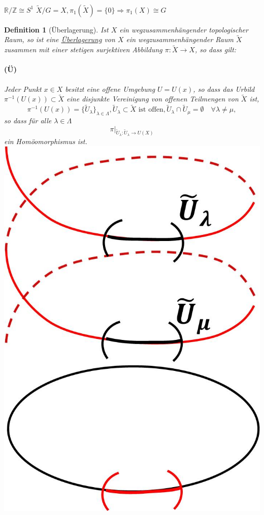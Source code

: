 \documentclass[a4paper,11pt,notitlepage]{report}
\newtheorem{definition}{Definition}[chapter]
\newcommand{\R}{{\ensuremath{\mathbb{R}}}}
\newcommand{\Z}{{\ensuremath{\mathbb{Z}}}}
\begin{document}
\paragraph{}
$\R / \Z \cong S^1$ \newline
$\tilde{X} /G = X, \pi_1(\tilde{X}) = \{0\} \Rightarrow \pi_1(X) \cong G$

\newpage 

\begin{definition}[Überlagerung]
	Ist $X$ ein wegzusammenhängender topologischer Raum, so ist eine \underline{Überlagerung} von $X$ ein wegzusammenhängender Raum $\tilde{X}$ zusammen mit einer stetigen surjektiven Abbildung $\pi \colon \tilde{X} \rightarrow X$, so dass gilt:
	\paragraph{(Ü)} \label{Ü} Jeder Punkt $x \in X$ besitzt eine offene Umgebung $U=U(x)$, so dass das Urbild $\pi^{-1}(U(x)) \subset \tilde{X}$ eine disjunkte Vereinigung von offenen Teilmengen von $\tilde{X}$ ist, 
	$$\pi^{-1}(U(x)) = \{\tilde{U}_\lambda\}_{\lambda \in \Lambda}, \tilde{U}_\lambda \subset \tilde{X}\text{ ist offen}, \tilde{U}_\lambda \cap \tilde{U}_\mu = \emptyset \quad \forall \lambda \neq \mu,$$ 
	so dass für alle $\lambda \in \Lambda$ 
	$$\pi \big |_{\tilde{U}_\lambda \colon \tilde{U}_\lambda \rightarrow U(X)}$$ ein Homöomorphismus ist.\newline
	\includegraphics[scale=0.4]{images/Spirale_disjunkt.jpg}

\end{definition}
\end{document}

